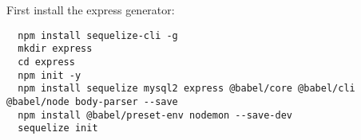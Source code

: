 First install the express generator:
\begin{verbatim}
  npm install sequelize-cli -g
  mkdir express
  cd express
  npm init -y
  npm install sequelize mysql2 express @babel/core @babel/cli @babel/node body-parser --save
  npm install @babel/preset-env nodemon --save-dev
  sequelize init
\end{verbatim}
